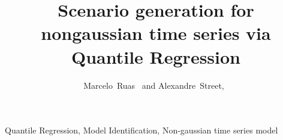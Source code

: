\documentclass[a4paper]{IEEEtran}
\begin{document}
\title{Scenario generation for nongaussian time series via Quantile Regression
}

\author{Marcelo~Ruas~%
	and Alexandre~Street,~	
	
	
}

\maketitle



\begin{IEEEkeywords}
	Quantile Regression, Model Identification, Non-gaussian time series model
\end{IEEEkeywords}


\listoftodos





%

%
%

%





%




\end{document}
